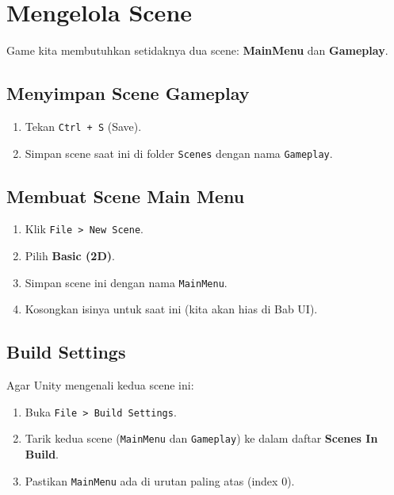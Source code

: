 
\section{Mengelola Scene}

Game kita membutuhkan setidaknya dua scene: \textbf{MainMenu} dan \textbf{Gameplay}.

\subsection{Menyimpan Scene Gameplay}

\begin{enumerate}
    \item Tekan \texttt{Ctrl + S} (Save).
    \item Simpan scene saat ini di folder \texttt{Scenes} dengan nama \texttt{Gameplay}.
\end{enumerate}

\subsection{Membuat Scene Main Menu}

\begin{enumerate}
    \item Klik \texttt{File > New Scene}.
    \item Pilih \textbf{Basic (2D)}.
    \item Simpan scene ini dengan nama \texttt{MainMenu}.
    \item Kosongkan isinya untuk saat ini (kita akan hias di Bab UI).
\end{enumerate}

\subsection{Build Settings}

Agar Unity mengenali kedua scene ini:

\begin{enumerate}
    \item Buka \texttt{File > Build Settings}.
    \item Tarik kedua scene (\texttt{MainMenu} dan \texttt{Gameplay}) ke dalam daftar \textbf{Scenes In Build}.
    \item Pastikan \texttt{MainMenu} ada di urutan paling atas (index 0).
\end{enumerate}
